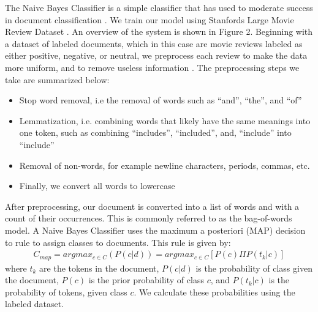 \documentclass[a0,portrait]{a0poster}
\begin{document}
\begin{multicols}{2}
The Naive Bayes Classifier is a simple classifier that has used to moderate success in document classification \cite{hand_idiots_2001, mccallum_comparison_1998}. We train our model using Stanfords Large Movie Review Dataset \cite{maas_learning_2011}. An overview of the system is shown in Figure 2.
\newline
\newline
Beginning with a dataset of labeled documents, which in this case are movie reviews labeled as either positive, negative, or neutral, we preprocess each review to make the data more uniform, and to remove useless information \cite{bird_natural_2009}. The preprocessing steps we take are summarized below:
\newline
\begin{itemize}
\item Stop word removal, i.e the removal of words such as “and”,  “the”, and “of”
\item Lemmatization, i.e. combining words that likely have the same meanings into one token, such as combining “includes”, “included”, and, “include” into “include”
\item Removal of non-words, for example newline characters, periods, commas, etc.
\item Finally, we convert all words to lowercase
\end{itemize}
\leavevmode
\newline
After preprocessing, our document is converted into a list of words and with a count of their occurrences. This is commonly referred to as the bag-of-words model. 
\newline
\newline
A Naive Bayes Classifier uses the maximum a posteriori (MAP) decision to rule to assign classes to documents. This rule is given by:
\begin{eqnarray}
C_{map} = argmax_{c\in C} (P(c|d)) = argmax_{c\in C}[P(c)\Pi P(t_k |c)]
\label{eqn:Equation 1}
\end{eqnarray}
where \(t_k\) are the tokens in the document, \(P(c|d)\) is the probability of class given the document, \(P(c)\) is the prior probability of class \(c\), and \(P(t_k|c)\) is the probability of tokens, given class \(c\). We calculate these probabilities using the labeled dataset. 
\leavevmode
\newline


\end{multicols}
\end{document}

